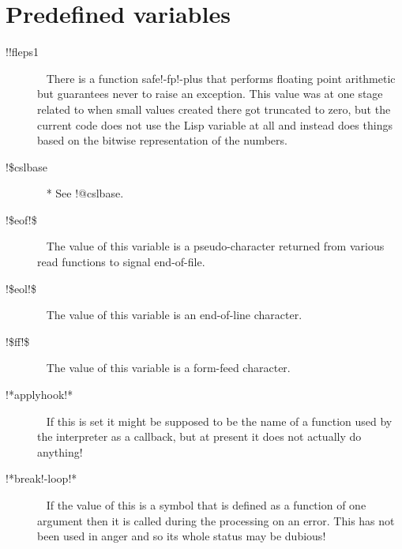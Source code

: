 \documentclass[a4paper,11pt]{article}
\begin{document}
\section{Predefined variables}
\begin{description}

\item [{\ttfamily !!fleps1}]  ~\newline
There is a function safe!-fp!-plus that performs floating point
arithmetic but guarantees never to raise an exception. This value was
at one stage related to when small values created there got truncated to zero,
but the current code does not use the Lisp variable at all and instead does
things based on the bitwise representation of the numbers.

\item [{\ttfamily !\$cslbase}]  ~\newline
  * See {\ttfamily !@cslbase}.

\item [{\ttfamily !\$eof!\$}]  ~\newline
The value of this variable is a pseudo-character returned from various
read functions to signal end-of-file.

\item [{\ttfamily !\$eol!\$}] ~\newline
The value of this variable is an end-of-line character.

\item [{\ttfamily !\$ff!\$}]  ~\newline
The value of this variable is a form-feed character.

\item [{\ttfamily !*applyhook!*}]  ~\newline
If this is set it might be supposed to be the name of a function used
by the interpreter as a callback, but at present it does not actually do
anything!

\item [{\ttfamily !*break!-loop!*}]  ~\newline
If the value of this is a symbol that is defined as a function of one
argument then it is called during the processing on an error. This has not
been used in anger and so its whole status may be dubious!


\end{description}
\end{document}
